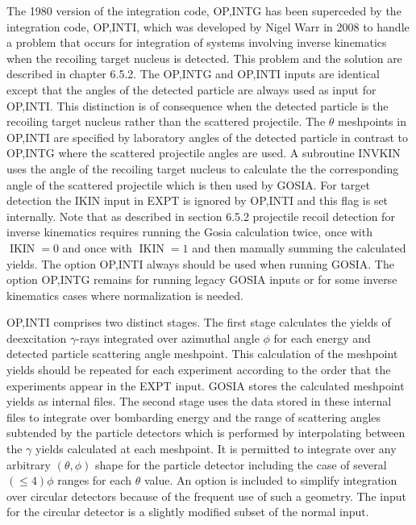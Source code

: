 \documentclass[10pt]{article}
\begin{document}
The 1980 version of the integration code, OP,INTG has been superceded by the integration code, OP,INTI, which was developed by Nigel Warr in 2008 to handle a problem that occurs for integration of systems involving inverse kinematics when the recoiling target nucleus is detected. This problem and the solution are described in chapter 6.5.2. The OP,INTG and OP,INTI inputs are identical except that the angles of the detected particle are always used as input for OP,INTI. This distinction is of consequence when the detected particle is the recoiling target nucleus rather than the scattered projectile. The $\theta$ meshpoints in OP,INTI are specified by laboratory angles of the detected particle in contrast to OP,INTG where the scattered projectile angles are used. A subroutine INVKIN uses the angle of the recoiling target nucleus to calculate the the corresponding angle of the scattered projectile which is then used by GOSIA. For target detection the IKIN input in EXPT is ignored by OP,INTI and this flag is set internally. Note that as described in section 6.5.2 projectile recoil detection for inverse kinematics requires running the Gosia calculation twice, once with $\operatorname{IKIN}=0$ and once with $\operatorname{IKIN}=1$ and then manually summing the calculated yields. The option OP,INTI always should be used when running GOSIA. The option OP,INTG remains for running legacy GOSIA inputs or for some inverse kinematics cases where normalization is needed.

OP,INTI comprises two distinct stages. The first stage calculates the yields of deexcitation $\gamma$-rays integrated over azimuthal angle $\phi$ for each energy and detected particle scattering angle meshpoint. This calculation of the meshpoint yields should be repeated for each experiment according to the order that the experiments appear in the EXPT input. GOSIA stores the calculated meshpoint yields as internal files. The second stage uses the data stored in these internal files to integrate over bombarding energy and the range of scattering angles subtended by the particle detectors which is performed by interpolating between the $\gamma$ yields calculated at each meshpoint. It is permitted to integrate over any arbitrary $(\theta, \phi)$ shape for the particle detector including the case of several $(\leq 4) \phi$ ranges for each $\theta$ value. An option is included to simplify integration over circular detectors because of the frequent use of such a geometry. The input for the circular detector is a slightly modified subset of the normal input.
\end{document}
